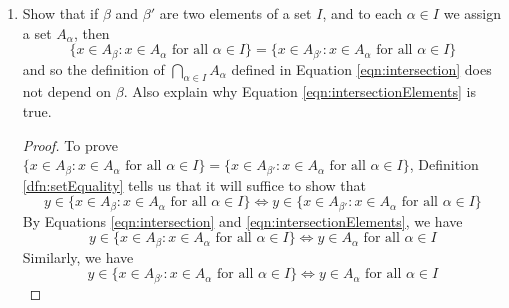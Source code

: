 \documentclass[../main.tex]{subfiles}
\begin{document}
\begin{enumerate}[ref={\thesection.\arabic*}]
\begin{proof}
        \begin{equation*}
            x\in A\cup B \Longleftrightarrow x\in S\text{ for some }S\in\{A,B\}
        \end{equation*}
        But by Axiom \ref{axm:singletonPair}, $S\in A\cup B$ iff $S=A$ or $S=B$. Therefore, we have
        \begin{equation*}
            x\in A\cup B \Longleftrightarrow x\in S\text{, }S\text{ being a set that satisfies }S=A\text{ or }S=B
        \end{equation*}
        or
        \begin{equation*}
            x\in A\cup B \Longleftrightarrow x\in A\text{ or }x\in B
        \end{equation*}
    \end{proof}
    \item \label{exr:3.4.9}Show that if $\beta$ and $\beta'$ are two elements of a set $I$, and to each $\alpha\in I$ we assign a set $A_\alpha$, then
    \begin{equation*}
        \{x\in A_\beta:x\in A_\alpha\text{ for all }\alpha\in I\} = \{x\in A_{\beta'}:x\in A_\alpha\text{ for all }\alpha\in I\}
    \end{equation*}
    and so the definition of $\bigcap_{\alpha\in I}A_\alpha$ defined in Equation \ref{eqn:intersection} does not depend on $\beta$. Also explain why Equation \ref{eqn:intersectionElements} is true.
    \begin{proof}
        To prove $\{x\in A_\beta:x\in A_\alpha\text{ for all }\alpha\in I\}=\{x\in A_{\beta'}:x\in A_\alpha\text{ for all }\alpha\in I\}$, Definition \ref{dfn:setEquality} tells us that it will suffice to show that
        \begin{equation*}
            y\in\{x\in A_\beta:x\in A_\alpha\text{ for all }\alpha\in I\} \Longleftrightarrow y\in\{x\in A_{\beta'}:x\in A_\alpha\text{ for all }\alpha\in I\}
        \end{equation*}
        By Equations \ref{eqn:intersection} and \ref{eqn:intersectionElements}, we have
        \begin{equation*}
            y\in\{x\in A_\beta:x\in A_\alpha\text{ for all }\alpha\in I\} \Longleftrightarrow y\in A_\alpha\text{ for all }\alpha\in I
        \end{equation*}
        Similarly, we have
        \begin{equation*}
            y\in\{x\in A_{\beta'}:x\in A_\alpha\text{ for all }\alpha\in I\} \Longleftrightarrow y\in A_\alpha\text{ for all }\alpha\in I

\end{equation*}
\end{proof}
\end{enumerate}
\end{document}
